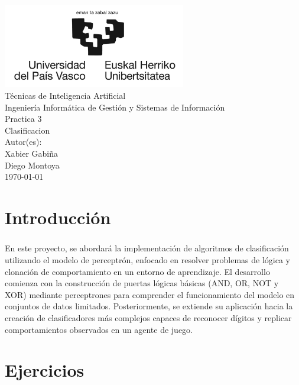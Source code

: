 \documentclass{report}
\begin{document}
  \begin{titlepage}
      \centering
      \includegraphics[width=0.6\textwidth]{./.img/logo.jpg}\\
      \vspace{1cm}
      \LARGE Técnicas de Inteligencia Artificial\\
      \vspace{0.5cm}
      \Large Ingeniería Informática de Gestión y Sistemas de Información\\
      \vspace{3cm}
      \Huge Practica 3\\
      \huge Clasificacion\\
      \vspace{2.5cm}
      \Large Autor(es):\\
      \vspace{0.2cm}
      \large Xabier Gabiña\\
      \large Diego Montoya\\
      \vfill
      \today
  \end{titlepage}
  \tableofcontents
  \listoffigures
  \listoftables
  \lstlistoflistings
  \chapter{Introducción}
    \paragraph*{}{
      En este proyecto, se abordará la implementación de algoritmos de clasificación utilizando el modelo de perceptrón, enfocado en resolver problemas de lógica y clonación de comportamiento en un entorno de aprendizaje. El desarrollo comienza con la construcción de puertas lógicas básicas (AND, OR, NOT y XOR) mediante perceptrones para comprender el funcionamiento del modelo en conjuntos de datos limitados. Posteriormente, se extiende su aplicación hacia la creación de clasificadores más complejos capaces de reconocer dígitos y replicar comportamientos observados en un agente de juego.
    }
  \chapter{Ejercicios}
\end{document}
